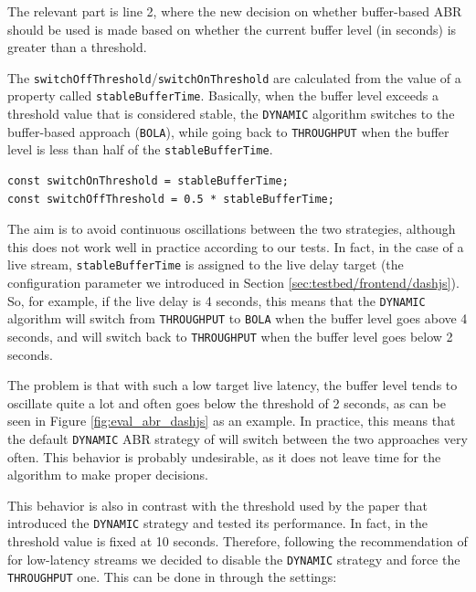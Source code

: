 The relevant part is line 2, where the new decision on whether buffer-based ABR should be used is made based on whether the current buffer level (in seconds) is greater than a threshold.

The \texttt{switchOffThreshold}/\texttt{switchOnThreshold} are calculated from the value of a property called \texttt{stableBufferTime}. Basically, when the buffer level exceeds a threshold value that is considered stable, the \texttt{DYNAMIC} algorithm switches to the buffer-based approach (\texttt{BOLA}), while going back to \texttt{THROUGHPUT} when the buffer level is less than half of the \texttt{stableBufferTime}.

\begin{verbatim}
const switchOnThreshold = stableBufferTime;
const switchOffThreshold = 0.5 * stableBufferTime;
\end{verbatim}

The aim is to avoid continuous oscillations between the two strategies, although this does not work well in practice according to our tests. In fact, in the case of a live stream, \texttt{stableBufferTime} is assigned to the live delay target (the configuration parameter we introduced in Section \ref{sec:testbed/frontend/dashjs}). So, for example, if the live delay is 4 seconds, this means that the \texttt{DYNAMIC} algorithm will switch from \texttt{THROUGHPUT} to \texttt{BOLA} when the buffer level goes above 4 seconds, and will switch back to \texttt{THROUGHPUT} when the buffer level goes below 2 seconds.

The problem is that with such a low target live latency, the buffer level tends to oscillate quite a lot and often goes below the threshold of 2 seconds, as can be seen in Figure \ref{fig:eval_abr_dashjs} as an example. In practice, this means that the default \texttt{DYNAMIC} ABR strategy of \dashjs{} will switch between the two approaches very often. This behavior is probably undesirable, as it does not leave time for the algorithm to make proper decisions.

This behavior is also in contrast with the threshold used by the paper that introduced the \texttt{DYNAMIC} strategy and tested its performance. In fact, in \cite{dashjs_dynamic} the threshold value is fixed at 10 seconds. Therefore, following the recommendation of \cite{dashjs_dynamic} for low-latency streams we decided to disable the \texttt{DYNAMIC} strategy and force the \texttt{THROUGHPUT} one. This can be done in \dashjs{} through the settings:

